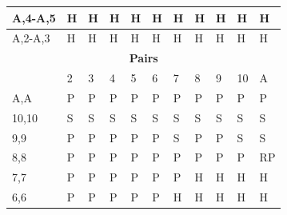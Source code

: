\documentclass[conference]{IEEEtran}
\begin{document}
\begin{table}[ht]
\begin{tabular}{|l|l|l|l|l|l|l|l|l|l|l|}
A,4-A,5                      & \cellcolor{green!50}H & \cellcolor{green!50}H & \cellcolor{green!50}H & \cellcolor{green!50}H & \cellcolor{green!50}H & \cellcolor{green!50}H & \cellcolor{green!50}H & \cellcolor{green!50}H & \cellcolor{green!50}H & \cellcolor{green!50}H  \\ \hline
A,2-A,3                      & \cellcolor{green!50}H & \cellcolor{green!50}H & \cellcolor{green!50}H & \cellcolor{green!50}H & \cellcolor{green!50}H & \cellcolor{green!50}H & \cellcolor{green!50}H & \cellcolor{green!50}H & \cellcolor{green!50}H & \cellcolor{green!50}H  \\ \hline \hline

\multicolumn{11}{|c|}{\textbf{Pairs}}                                 \\ \hline
                             & 2 & 3 & 4 & 5 & 6 & 7 & 8 & 9 & 10 & A \\ \hline
A,A                          & \cellcolor{yellow!75}P & \cellcolor{yellow!75}P & \cellcolor{yellow!75}P & \cellcolor{yellow!75}P & \cellcolor{yellow!75}P & \cellcolor{yellow!75}P & \cellcolor{yellow!75}P & \cellcolor{yellow!75}P & \cellcolor{yellow!75}P & \cellcolor{yellow!75}P  \\ \hline
10,10                        & \cellcolor{red!75}S & \cellcolor{red!75}S & \cellcolor{red!75}S & \cellcolor{red!75}S & \cellcolor{red!75}S & \cellcolor{red!75}S & \cellcolor{red!75}S & \cellcolor{red!75}S & \cellcolor{red!75}S & \cellcolor{red!75}S  \\ \hline
9,9                          & \cellcolor{yellow!75}P & \cellcolor{yellow!75}P & \cellcolor{yellow!75}P & \cellcolor{yellow!75}P & \cellcolor{yellow!75}P & \cellcolor{red!75}S & \cellcolor{yellow!75}\cellcolor{yellow!75}P & \cellcolor{yellow!75}P & \cellcolor{red!75}S & \cellcolor{red!75}S  \\ \hline
8,8                          & \cellcolor{yellow!75}P & \cellcolor{yellow!75}P & \cellcolor{yellow!75}P & \cellcolor{yellow!75}P & \cellcolor{yellow!75}P & \cellcolor{yellow!75}P & \cellcolor{yellow!75}P & \cellcolor{yellow!75}P & \cellcolor{yellow!75}P & \cellcolor{magenta!80}RP  \\ \hline
7,7                          & \cellcolor{yellow!75}P & \cellcolor{yellow!75}P & \cellcolor{yellow!75}P & \cellcolor{yellow!75}P & \cellcolor{yellow!75}P & \cellcolor{yellow!75}P & \cellcolor{green!50}H & \cellcolor{green!50}H & \cellcolor{green!50}H & \cellcolor{green!50}H  \\ \hline
6,6                           & \cellcolor{yellow!75}P & \cellcolor{yellow!75}P & \cellcolor{yellow!75}P & \cellcolor{yellow!75}P & \cellcolor{yellow!75}P & \cellcolor{green!50}H & \cellcolor{green!50}H & \cellcolor{green!50}H & \cellcolor{green!50}H & \cellcolor{green!50}H  \\ \hline

\end{tabular}
\end{table}
\end{document}
